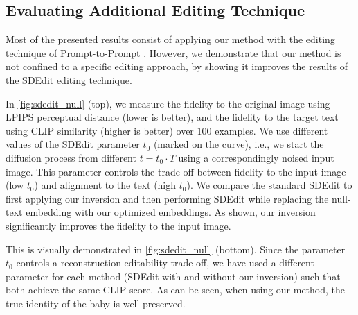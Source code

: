 \label{tab:times}


\subsection{Evaluating Additional Editing Technique}


Most of the presented results consist of applying our method with the editing technique of Prompt-to-Prompt \cite{hertz2022prompt}. However, we demonstrate that our method is not confined to a specific editing approach, by showing it improves the results of the SDEdit \cite{meng2021sdedit} editing technique.

In \cref{fig:sdedit_null} (top), we measure the fidelity to the original image using LPIPS perceptual distance \cite{Zhang2018TheUE} (lower is better), and the fidelity to the target text using CLIP similarity \cite{radford2021learning} (higher is better) over $100$ examples. We use different values of the SDEdit parameter $t_0$ (marked on the curve), i.e., we start the diffusion process from different $t = t_0 \cdot T$ using a correspondingly noised input image. This parameter controls the trade-off between fidelity to the input image (low $t_0$) and alignment to the text (high $t_0$). We compare the standard SDEdit to first applying our inversion and then performing SDEdit while replacing the null-text embedding with our optimized embeddings. As shown, our inversion significantly improves the fidelity to the input image.

This is visually demonstrated in \cref{fig:sdedit_null} (bottom). Since the parameter $t_0$ controls a reconstruction-editability trade-off, we have used a different parameter for each method (SDEdit with and without our inversion) such that both achieve the same CLIP score. As can be seen, when using our method, the true identity of the baby is well preserved. 






